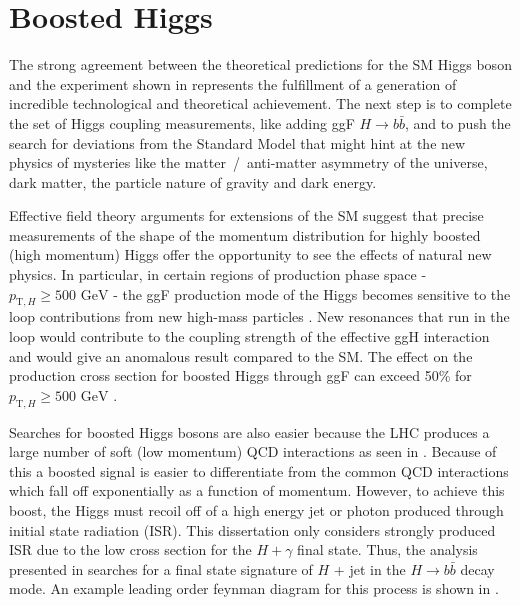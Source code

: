 \section{Boosted Higgs} \label{sec:higgs:boosted}

The strong agreement between the theoretical predictions for the SM Higgs boson
and the experiment shown in  represents the
fulfillment of a generation of incredible technological and theoretical
achievement.  The next step is to complete the set of Higgs coupling
measurements, like adding ggF $H \rightarrow b\bar{b}$, and to push the search
for deviations from the Standard Model that might hint at the new physics of
mysteries like the matter~/~anti-matter asymmetry of the universe, dark matter,
the particle nature of gravity and dark energy. 

Effective field theory arguments for extensions of the SM suggest that precise
measurements of the shape of the momentum distribution for highly boosted (high
momentum) Higgs offer the opportunity to see the effects of natural new
physics.  In particular, in certain regions of production phase space -
$p_{\text{T},H} \geq \text{500 GeV}$ - the ggF production mode of the Higgs becomes
sensitive to the loop contributions from new high-mass particles
\cite{Schlaffer:2014osa}.  New resonances that run in the loop would contribute
to the coupling strength of the effective ggH interaction and
would give an anomalous result compared to the SM. The effect on the
production cross section for boosted Higgs through ggF can exceed 50\% for
$p_{\text{T},H} \geq \text{500 GeV}$ \cite{Schlaffer:2014osa,Grojean:2013nya,Dawson:2015gka}.

Searches for boosted Higgs bosons are also easier because the LHC produces a
large number of soft (low momentum) QCD interactions as seen in
.  Because of this a boosted signal is easier
to differentiate from the common QCD interactions which fall off exponentially
as a function of momentum.  However, to achieve this boost, the Higgs must
recoil off of a high energy jet or photon \cite{Aaboud:2018zba} produced
through initial state radiation (ISR). This dissertation only considers
strongly produced ISR due to the low cross section for the $H + \gamma$ final
state.  Thus, the analysis presented in  searches for a final
state signature of $H$ + jet in the $H \rightarrow b\bar{b}$ decay mode.  An
example leading order feynman diagram for this process is shown in
.

